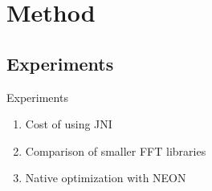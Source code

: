 \documentclass[xcolor={table}]{beamer}
\begin{document}

\section{Method}

\subsection{Experiments}
\begin{frame}{Experiments}
    \begin{enumerate}
        \item Cost of using JNI
        \item Comparison of smaller FFT libraries
        \item Native optimization with NEON
    \end{enumerate}
\end{frame}
\end{document}
